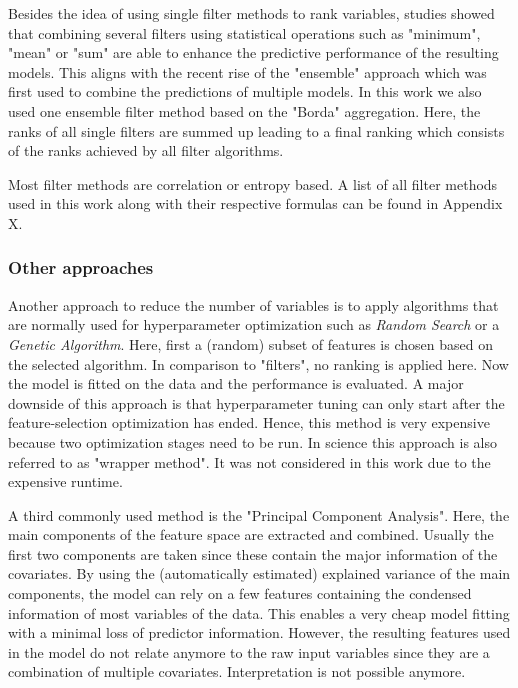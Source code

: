 \documentclass[review]{elsarticle}
\begin{document}
Besides the idea of using single filter methods to rank variables, studies showed that combining several filters using statistical operations such as "minimum", "mean" or "sum" are able to enhance the predictive performance of the resulting models.
This aligns with the recent rise of the "ensemble" approach which was first used to combine the predictions of multiple models.
In this work we also used one ensemble filter method based on the "Borda" aggregation.
Here, the ranks of all single filters are summed up leading to a final ranking which consists of the ranks achieved by all filter algorithms.

Most filter methods are correlation or entropy based.
A list of all filter methods used in this work along with their respective formulas can be found in Appendix X.

\subsubsection{Other approaches}

Another approach to reduce the number of variables is to apply algorithms that are normally used for hyperparameter optimization such as \textit{Random Search} or a \textit{Genetic Algorithm}.
Here, first a (random) subset of features is chosen based on the selected algorithm.
In comparison to "filters", no ranking is applied here.
Now the model is fitted on the data and the performance is evaluated.
A major downside of this approach is that hyperparameter tuning can only start after the feature-selection optimization has ended.
Hence, this method is very expensive because two optimization stages need to be run.
In science this approach is also referred to as "wrapper method".
It was not considered in this work due to the expensive runtime.

A third commonly used method is the "Principal Component Analysis".
Here, the main components of the feature space are extracted and combined.
Usually the first two components are taken since these contain the major information of the covariates.
By using the (automatically estimated) explained variance of the main components, the model can rely on a few features containing the condensed information of most variables of the data.
This enables a very cheap model fitting with a minimal loss of predictor information.
However, the resulting features used in the model do not relate anymore to the raw input variables since they are a combination of multiple covariates.
Interpretation is not possible anymore.
\end{document}
